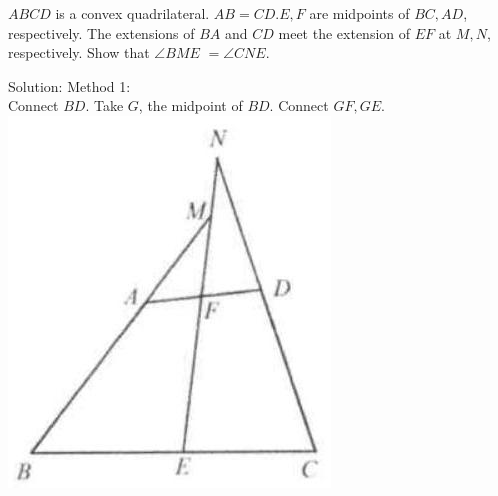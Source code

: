 \documentclass{article}
\begin{document}
\(A B C D\) is a convex quadrilateral. \(A B=C D . E, F\) are midpoints of \(B C, A D\), respectively. The extensions of \(B A\) and \(C D\) meet the extension of \(E F\) at \(M, N\), respectively. Show that \(\angle B M E\) \(=\angle C N E\).

Solution:
Method 1:\\
Connect \(B D\). Take \(G\), the midpoint of \(B D\). Connect \(G F, G E\).\\
\centering
\includegraphics[width=\textwidth]{images/042(2).jpg}
\end{document}
